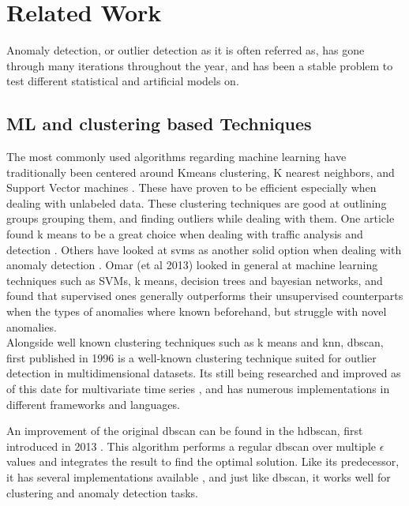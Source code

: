 \section{Related Work}
\label{relwork:anomaly}

Anomaly detection, or outlier detection as it is often referred as, has gone through many iterations throughout the year, and has been a stable problem to test different statistical and artificial models on. \\ 


\subsection{ML and clustering based Techniques}

The most commonly used algorithms regarding machine learning have traditionally been centered around Kmeans clustering, K nearest neighbors, and  Support Vector machines \cite{10.14778/3538598.3538602, 10.1145/3444690}. These have proven to be efficient especially when dealing with unlabeled data. These clustering techniques are good at outlining groups grouping them, and finding outliers while dealing with them. One article found k means to be a great choice when dealing with traffic analysis and detection \cite{7507933}. Others have looked at svms as another solid option when dealing with anomaly detection \cite{10.1007/978-3-540-28647-9_97}. Omar (et al 2013) \cite{omar2013machine} looked in general at machine learning techniques such as SVMs, k means, decision trees and bayesian networks, and found that supervised ones generally outperforms their unsupervised counterparts when the types of anomalies where known beforehand, but struggle with novel anomalies. \\ 

Alongside well known clustering techniques such as k means and knn, \acrfull{dbscan}, first published in 1996 \cite{10.5555/3001460.3001507} is a well-known clustering technique suited for outlier detection in multidimensional datasets. Its still being researched and improved as of this date for multivariate time series \cite{waltz2024time}, and has numerous implementations in different frameworks and languages. 

An improvement of the original \acrshort{dbscan} can be found in the \acrfull{hdbscan}, first introduced in 2013 \cite{10.1007/978-3-642-37456-2_14}. This algorithm performs a regular dbscan over multiple $\epsilon$ values and integrates the result to find the optimal solution. Like its predecessor, it has several implementations available \cite{McInnes2017}, and just like dbscan, it works well for clustering and anomaly detection tasks. \\




